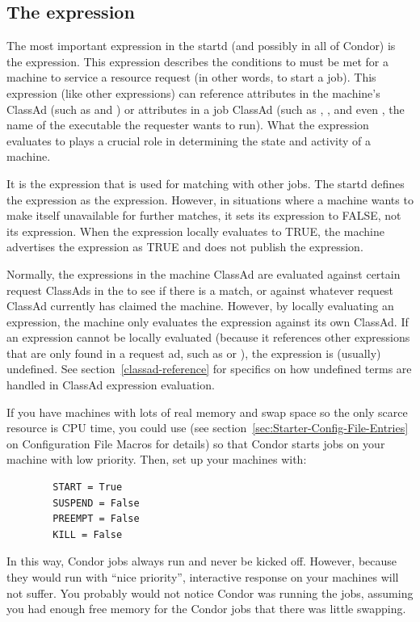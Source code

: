 \subsection{\label{sec:Start-Expr}
The  expression}

The most important expression in the startd (and possibly in all of
Condor) is the  expression.  
This expression describes the conditions to must be met for a
machine to service a resource request (in other words, to start a
job). 
This expression (like other expressions) can reference attributes
in the machine's ClassAd (such as  and )
or attributes in a job ClassAd (such as
, , and even , the name of the
executable the requester wants to run).
What the  expression evaluates to plays a crucial role in
determining the state and activity of a machine.

It is the  expression that is used for
matching with other jobs.
The startd defines the
 expression as the  expression.
However, in situations where a machine wants to make itself
unavailable for further matches, it sets its 
expression to FALSE, not its  expression.  
When the  expression locally evaluates to TRUE, the
machine advertises the  expression as TRUE and
does not publish the  expression.

Normally, the expressions in the machine ClassAd are evaluated against
certain request ClassAds in the  to see if there is
a match, or against whatever request ClassAd currently has claimed the
machine.  However, by locally evaluating an expression, the machine only
evaluates the expression against its own ClassAd.  If an expression
cannot be locally evaluated (because it references other expressions
that are only found in a request ad, such as  or
), the expression is (usually) undefined.
See section~\ref{classad-reference} for specifics on
how undefined terms are handled in ClassAd expression evaluation. 

\Note If you have machines with lots of real memory and swap space so
  the only scarce resource is CPU time, you could use
   (see
  section~\ref{sec:Starter-Config-File-Entries} on 
  Configuration File Macros for details) so that Condor starts jobs on
  your machine with low priority.
  Then, set up your machines with:
\begin{verbatim}
        START = True
        SUSPEND = False
        PREEMPT = False
        KILL = False
\end{verbatim}
  In this way, Condor jobs always run and never be kicked off. 
  However, because they would run with ``nice priority'', interactive 
  response on your machines will not suffer.
  You probably would not notice Condor was running the jobs, 
  assuming you had enough free memory for the Condor jobs that there
  was little swapping.

